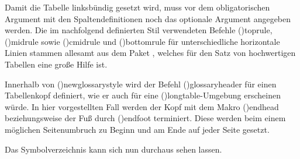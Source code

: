 \documentclass[%
  english,ngerman,%
  cdgeometry=no,DIV=12,%
  cd=false,cdfont=false,cdtitle=true,%
  headings=normal,%
  automark,%
  listof=toc,%
]{tudscrartcl}
\begin{document}
Damit die Tabelle linksbündig gesetzt wird, muss vor dem obligatorischen 
Argument mit den Spaltendefinitionen noch das optionale Argument  
angegeben werden. Die im nachfolgend definierten Stil verwendeten Befehle 
\Macro(){toprule}, \Macro(){midrule} sowie
\Macro(){cmidrule} und \Macro(){bottomrule} 
für unterschiedliche horizontale Linien stammen allesamt aus dem Paket 
, welches für den Satz von hochwertigen Tabellen eine große 
Hilfe ist.
%
\CodeHook{\let\newglossarystyle\renewglossarystyle}
\begin{Preamble*}
\end{Preamble*}
%
Innerhalb von \Macro(){newglossarystyle} wird der Befehl 
\Macro(){glossaryheader} für einen Tabellenkopf definiert, 
wie er auch für eine \Environment(){longtable}-Umgebung 
erscheinen würde. In hier vorgestellten Fall werden der Kopf mit dem Makro 
\Macro(){endhead} beziehungsweise der Fuß durch 
\Macro(){endfoot} terminiert. Diese werden beim 
einem möglichen Seitenumbruch zu Beginn und am Ende auf jeder Seite gesetzt.
%
\begin{Preamble+}
}%

\end{Preamble+}
%
Das Symbolverzeichnis kann sich nun durchaus sehen lassen.
%
\begin{Hint}
\printsymbols[style=symblongtabu]
\end{Hint}
\begin{quoting}[rightmargin=0pt]
\printsymbols[style=symbtabu]
\end{quoting}
\end{document}
